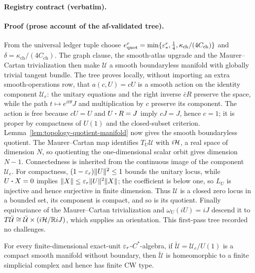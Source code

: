 \noindent\textbf{Registry contract (verbatim).}

\paragraph{Proof (prose account of the af-validated tree).}
From the universal ledger tuple choose
$e^{r}_{\mathrm{quot}}=\min\{\varepsilon_*^r,\tfrac14,
\kappa_{\mathrm{ch}}/(4C_{\mathrm{ch}})\}$ and
$\delta=\kappa_{\mathrm{ch}}/(4C_{\mathrm{ch}})$.
The graph clause, the smooth-atlas upgrade and the Maurer--Cartan trivialization then
make $\mathcal U$ a smooth boundaryless manifold with globally trivial tangent bundle.
The tree proves locally, without importing an extra smooth-operations row, that
$a(c,U)=cU$ is a smooth action on the identity component $\mathcal U_e$:
the unitary equations and the right inverse $\bar cR$ preserve the space, while the
path $t\mapsto e^{it\theta}J$ and multiplication by $c$ preserve its component.
The action is free because $cU=U$ and $U\mathbin{\bm{\cdot}} R=J$ imply $cJ=J$, hence $c=1$;
it is proper by compactness of $U(1)$ and the closed-subset criterion.
Lemma~\ref{lem:topology-quotient-manifold} now gives the smooth boundaryless quotient.
The Maurer--Cartan map identifies $T_U\mathcal U$ with $i\mathcal H$, a real space of
dimension $N$, so quotienting the one-dimensional scalar orbit gives dimension $N-1$.
Connectedness is inherited from the continuous image of the component $\mathcal U_e$.
For compactness, $(1-\varepsilon_r)\lVert U\rVert^2\le1$ bounds the unitary locus, while
$U\mathbin{\bm{\cdot}} X=0$ implies $\lVert X\rVert\le\varepsilon_r\lVert U\rVert^2\lVert X\rVert$; the coefficient is below one,
so $L_U$ is injective and hence surjective in finite dimension.
Thus $\mathcal U$ is a closed zero locus in a bounded set, its component is compact,
and so is its quotient.  Finally equivariance of the Maurer--Cartan trivialization and
$\omega_U(iU)=iJ$ descend it to
$T\breve{\mathcal U}\cong\breve{\mathcal U}\times(i\mathcal H/\mathbb RiJ)$,
which supplies an orientation.  This first-pass tree recorded no challenges.

\begin{lemma}\label{lem:stage1-quotient-finite-cw}
For every finite-dimensional exact-unit $\varepsilon_r$-$C^{*}$-algebra, if
$\breve{\mathcal U}=\mathcal U_e/U(1)$ is a compact smooth manifold without boundary,
then $\breve{\mathcal U}$ is homeomorphic to a finite simplicial complex and hence has
finite CW type.
\end{lemma}

